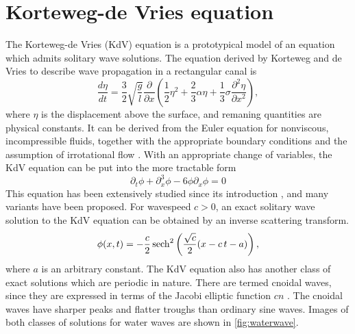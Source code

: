 \documentclass[thesis.tex]{subfiles}
\begin{document}
\section{Korteweg-de Vries equation}

The Korteweg-de Vries (KdV) equation is a prototypical model of an equation which admits solitary wave solutions. The equation derived by Korteweg and de Vries \cite{KdVoriginal} to describe wave propagation in a rectangular canal is  
\[
\frac{d \eta}{dt} = \frac{3}{2} \sqrt{\frac{g}{l}}
\frac{\partial}{\partial x}
\left( \frac{1}{2} \eta^2 + \frac{2}{3} \alpha \eta + \frac{1}{3} \sigma \frac{\partial^2 \eta}{\partial x^2}\right),
\]
where $\eta$ is the displacement above the surface, and remaning quantities are physical constants. It can be derived from the Euler equation for nonviscous, incompressible fluids, together with the appropriate boundary conditions and the assumption of irrotational flow \cite{SolitonPhysics}. With an appropriate change of variables, the KdV equation can be put into the more tractable form
\begin{equation}\label{KdV3}
\partial_t \phi + \partial_x^3 \phi - 6 \phi \partial_x \phi = 0
\end{equation}
This equation has been extensively studied since its introduction \cite{miles1981,drazin1989solitons,SolitonPhysics}, and many variants have been proposed. For wavespeed $c > 0$, an exact solitary wave solution to the KdV equation can be obtained by an inverse scattering transform.
\[
\phi (x,t)=-{\frac {c}{2}}\,\mathrm {sech} ^{2}\left({{\sqrt {c}} \over 2}(x-c\,t-a)\right),
\]
where $a$ is an arbitrary constant. The KdV equation also has another class of exact solutions which are periodic in nature. There are termed cnoidal waves, since they are expressed in terms of the Jacobi elliptic function $cn$ \cite{drazin1989solitons}. The cnoidal waves have sharper peaks and flatter troughs than ordinary sine waves. Images of both classes of solutions for water waves are shown in \cref{fig:waterwave}.
\end{document}
